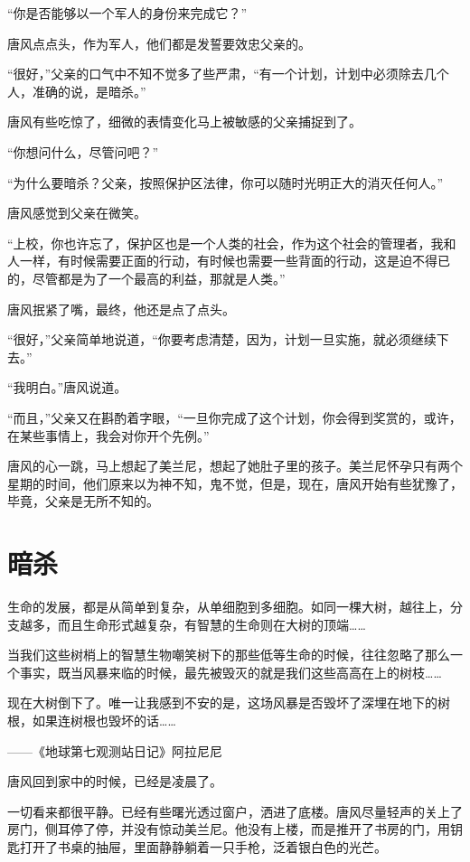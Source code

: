 “你是否能够以一个军人的身份来完成它？”

唐风点点头，作为军人，他们都是发誓要效忠父亲的。

“很好，”父亲的口气中不知不觉多了些严肃，“有一个计划，计划中必须除去几个人，准确的说，是暗杀。”

唐风有些吃惊了，细微的表情变化马上被敏感的父亲捕捉到了。

“你想问什么，尽管问吧？”

“为什么要暗杀？父亲，按照保护区法律，你可以随时光明正大的消灭任何人。”

唐风感觉到父亲在微笑。

“上校，你也许忘了，保护区也是一个人类的社会，作为这个社会的管理者，我和人一样，有时候需要正面的行动，有时候也需要一些背面的行动，这是迫不得已的，尽管都是为了一个最高的利益，那就是人类。”

唐风抿紧了嘴，最终，他还是点了点头。

“很好，”父亲简单地说道，“你要考虑清楚，因为，计划一旦实施，就必须继续下去。”

“我明白。”唐风说道。

“而且，”父亲又在斟酌着字眼，“一旦你完成了这个计划，你会得到奖赏的，或许，在某些事情上，我会对你开个先例。”

唐风的心一跳，马上想起了美兰尼，想起了她肚子里的孩子。美兰尼怀孕只有两个星期的时间，他们原来以为神不知，鬼不觉，但是，现在，唐风开始有些犹豫了，毕竟，父亲是无所不知的。

\chapter{暗杀}
\begin{myquote}
生命的发展，都是从简单到复杂，从单细胞到多细胞。如同一棵大树，越往上，分支越多，而且生命形式越复杂，有智慧的生命则在大树的顶端……

当我们这些树梢上的智慧生物嘲笑树下的那些低等生命的时候，往往忽略了那么一个事实，既当风暴来临的时候，最先被毁灭的就是我们这些高高在上的树枝……

现在大树倒下了。唯一让我感到不安的是，这场风暴是否毁坏了深埋在地下的树根，如果连树根也毁坏的话……
\end{myquote}

\begin{myflushright}
——《地球第七观测站日记》阿拉尼尼
\end{myflushright}

唐风回到家中的时候，已经是凌晨了。

一切看来都很平静。已经有些曙光透过窗户，洒进了底楼。唐风尽量轻声的关上了房门，侧耳停了停，并没有惊动美兰尼。他没有上楼，而是推开了书房的门，用钥匙打开了书桌的抽屉，里面静静躺着一只手枪，泛着银白色的光芒。

